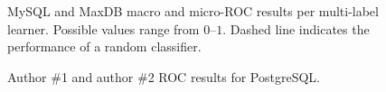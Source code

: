 \documentclass[smallextended]{svjour3}       %
\begin{document}
\begin{figure}[t]
\centering
{}
\caption[]{MySQL and MaxDB macro and micro-ROC results per multi-label learner. Possible values range from $0$--$1$.  Dashed line indicates the performance of a random classifier.
}
\label{fig:mulan}
\end{figure}

\begin{figure}
\centering
{}
\caption{Author \#1 and author \#2 ROC results for PostgreSQL.} 
\label{fig:pgcomp}
\end{figure}
\end{document}
